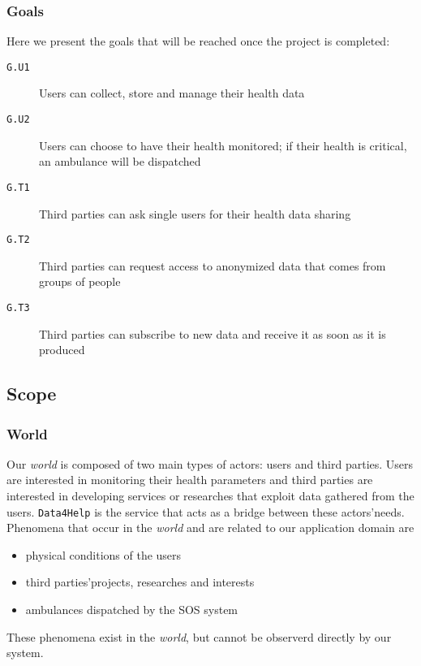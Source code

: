      \subsubsection{Goals}
      \label{sec:goals}

        Here we present the goals that will be reached once the project is completed:

        \begin{description}
          \item[\texttt{G.U1}] Users can collect, store and manage their health data
          \item[\texttt{G.U2}] Users can choose to have their health monitored; if their health is critical, an ambulance will be dispatched
          \item[\texttt{G.T1}] Third parties can ask single users for their health data sharing
          \item[\texttt{G.T2}] Third parties can request access to anonymized data that comes from groups of people
          \item[\texttt{G.T3}] Third parties can subscribe to new data and receive it as soon as it is produced
        \end{description}

  \subsection{Scope}

    \subsubsection{World}

      Our \textit{world} is composed of two main types of actors: users and third parties. Users are interested in monitoring their health parameters and third parties are interested in developing services or researches that exploit data gathered from the users. \texttt{Data4Help} is the service that acts as a bridge between these actors'needs. \\
      Phenomena that occur in the \textit{world} and are related to our application domain are
      \begin{itemize}
        \item physical conditions of the users
        \item third parties'projects, researches and interests
        \item ambulances dispatched by the SOS system
      \end{itemize}
      These phenomena exist in the \textit{world}, but cannot be observerd directly by our system.


